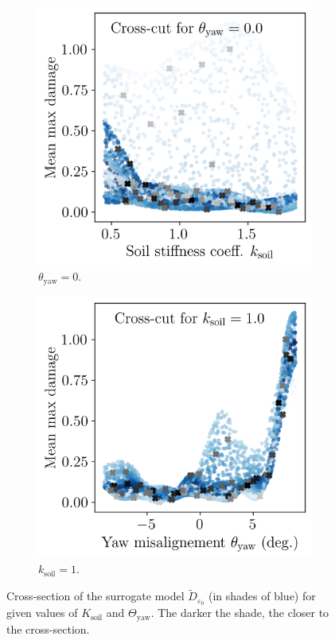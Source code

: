 \begin{figure}[h!]
    \centering
    \begin{subfigure}[b]{0.38\linewidth}
        \includegraphics[width=\linewidth]{./part3/figures/OWT/dam_vs_soil_surrogate.png}
        \caption{$\theta_{\mathrm{yaw}}=0$.}
    \end{subfigure}
    \begin{subfigure}[b]{0.38\linewidth}
        \includegraphics[width=\linewidth]{./part3/figures/OWT/dam_vs_yaw_surrogate.png}
        \caption{$k_{\mathrm{soil}}=1$.}
    \end{subfigure}
    \caption{Cross-section of the surrogate model $\widetilde{D}_{\varepsilon_0}$ (in shades of blue) for given values of $K_{\mathrm{soil}}$ and $\Theta_{\mathrm{yaw}}$. The darker the shade, the closer to the cross-section.}
    \label{fig:owt_surrogate}
\end{figure}

